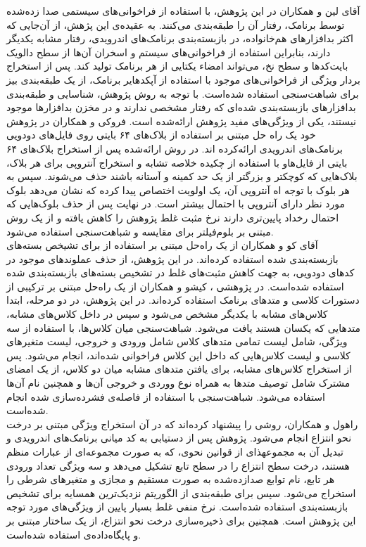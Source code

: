 آقای لین و همکاران در این پژوهش، با استفاده از فراخوانی‌های سیستمی صدا زده‌شده توسط برنامک، رفتار آن را طبقه‌بندی می‌کنند. به عقیده‌ی این پژهش، از آن‌جایی که اکثر بدافزار‌های هم‌خانواده، در بازبسته‌بندی برنامک‌های اندرویدی، رفتار مشابه یکدیگر دارند، بنابراین استفاده از فراخوانی‌های سیستم و اسخران آن‌ها از سطح دالویک بایت‌کد‌ها و سطح نخ، می‌تواند امضاء یکتایی از هر برنامک تولید کند. پس از استخراج بردار ویژگی از فراخوانی‌های موجود با استفاده از آپکد‌هایر برنامک، از یک طبقه‌بندی بیز برای شباهت‌سنجی استفاده شده‌است. با توجه به روش پژوهش، شناسایی و طبقه‌بندی بدافزار‌های بازبسته‌بندی شده‌ای که رفتار مشخصی ندارند و در مخزن بدافزار‌ها موجود نیستند، یکی از ویژگی‌های مفید پژوهش ارائه‌شده است. فروکی  و همکاران در پژوهش خود یک راه حل مبتنی بر استفاده از بلاک‌های ۶۴ بایتی روی فایل‌های دودویی برنامک‌های اندرویدی ارائه‌کرده ‌اند. در روش ارائه‌شده پس از استخراج بلاک‌های ۶۴ بایتی از فایل‌هاو با استفاده از چکیده‌ خلاصه تشابه و استخراج آنتروپی برای هر بلاک، بلاک‌هایی که کوچکتر و بزرگتر از یک حد کمینه و آستانه باشند حذف می‌شوند. سپس به هر بلوک با توجه اه آنتروپی آن، یک اولویت اختصاص پیدا کرده که نشان می‌دهد بلوک مورد نظر دارای آنتروپی با احتمال بیشتر است. در نهایت پس از حذف بلوک‌هایی که احتمال رخداد پایین‌تری دارند نرخ مثبت غلط پژوهش را کاهش یافته و از یک روش مبتنی بر بلوم‌فیلتر برای مقایسه‌ و شباهت‌سنجی استفاده می‌شود.\\
آقای کو و همکاران از یک راه‌حل مبتنی بر استفاده از  برای تشیخص بسته‌های بازبسته‌بندی شده استفاده کرده‌اند. در این پژوهش، از  حذف عملوند‌های موجود در کد‌های دودویی، به‌ جهت کاهش مثبت‌های غلط در تشخیص بسته‌های بازبسته‌بندی شده استفاده شده‌است.
در پژوهشی ، کیشو و همکاران از یک راه‌حل مبتنی بر ترکیبی از دستورات کلاسی و متد‌های برنامک استفاده ‌کرده‌اند‌. در این پژوهش، در دو مرحله، ابتدا کلاس‌های مشابه‌ با یکدیگر مشخص می‌شود و سپس در داخل کلاس‌های مشابه، متد‌هایی که یکسان هستند یافت می‌شود. شباهت‌سنجی میان کلاس‌ها، با استفاده از سه ویژگی، شامل لیست تمامی‌ متد‌های کلاس شامل ورودی و خروجی، لیست متغیر‌های کلاسی و لیست کلاس‌هایی که داخل این کلاس فراخوانی ‌شده‌اند، انجام می‌شود. پس از استخراج کلاس‌های مشابه، برای یافتن متد‌های مشابه میان دو کلاس، از یک امضای مشترک شامل توصیف متد‌ها به همراه نوع ووردی و خروجی آن‌ها و همچنین نام آن‌ها استفاده می‌شود. شباهت‌سنجی با استفاده از فاصله‌ی فشرده‌سازی شده انجام شده‌است.\\
راهول و همکاران، روشی را پیشنهاد کرده‌اند که در آن استخراج ویژگی مبتنی بر درخت نحو انتزاع انجام می‌شود. پژوهش پس از دستیابی به کد میانی برنامک‌های اندرویدی و تبدیل آن به مجموعهذای از قوانین نحوی، که به صورت مجموعه‌ای از عبارات منظم هستند، درخت سطح انتزاع را در سطح تابع تشکیل می‌دهد و سه ویژگی تعداد ورودی هر تابع، نام توابع صدازده‌شده به صورت مستقیم و مجازی و متغیر‌های شرطی را استخراج می‌شود. سپس برای طبقه‌بندی از الگوریتم نزدیک‌ترین همسایه‌ برای تشخیص بازبسته‌بندی استفاده شده‌است. نرخ منفی غلط بسیار پایین از ویژگی‌های مورد توجه این پژوهش است. همچنین برای ذخیره‌سازی درخت نحو انتزاع، از یک ساختار مبتنی بر  و پایگاه‌داده‌ی  استفاده شده‌است.\\
